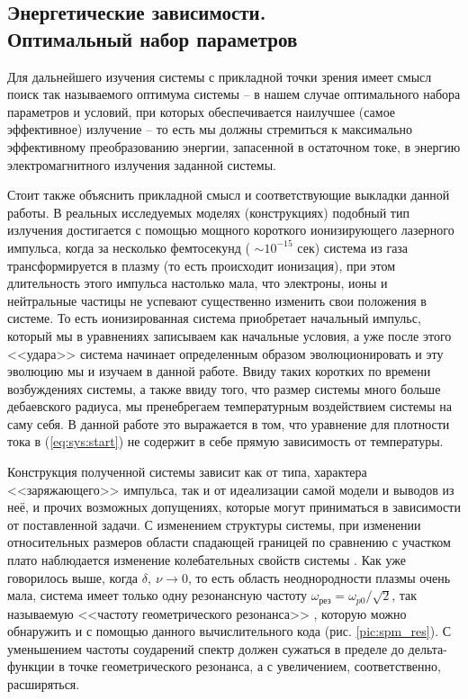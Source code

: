 \subsection{Энергетические зависимости. \\Оптимальный набор параметров}

Для дальнейшего изучения системы с прикладной точки зрения имеет смысл поиск так называемого оптимума системы -- в нашем случае оптимального набора параметров и условий, при которых обеспечивается наилучшее (самое эффективное) излучение -- то есть мы должны стремиться к максимально эффективному преобразованию энергии, запасенной в остаточном токе, в энергию электромагнитного излучения заданной системы. 

Стоит также объяснить прикладной смысл и соответствующие выкладки данной работы. В реальных исследуемых моделях (конструкциях) подобный тип излучения достигается с помощью мощного короткого ионизирующего лазерного импульса, когда за несколько фемтосекунд ( $\sim10^{-15}$ сек) система из газа трансформируется в плазму (то есть происходит ионизация), при этом длительность этого импульса настолько мала, что электроны, ионы и нейтральные частицы не успевают существенно изменить свои положения в системе. То есть ионизированная система приобретает начальный импульс, который мы в уравнениях записываем как начальные условия, а уже после этого <<удара>> система начинает определенным образом эволюционировать и эту эволюцию мы и изучаем в данной работе. Ввиду таких коротких по времени возбуждениях системы, а также ввиду того, что размер системы много больше дебаевского радиуса, мы пренебрегаем температурным воздействием системы на саму себя. В данной работе это выражается в том, что уравнение для плотности тока в (\ref{eq:sys:start}) не содержит в себе прямую зависимость от температуры.

Конструкция полученной системы зависит как от типа, характера <<заряжающего>> импульса, так и от идеализации самой модели и выводов из неё, и прочих возможных допущениях, которые могут приниматься в зависимости от поставленной задачи. С изменением структуры системы, при изменении относительных размеров области спадающей границей по сравнению с участком плато наблюдается изменение колебательных свойств системы \cite{Vved2005}. Как уже говорилось выше, когда $\delta,\:\nu\rightarrow0$, то есть область неоднородности плазмы очень мала, система  имеет только одну резонансную частоту $\omega_{\text{рез}}=\omega_{p 0}/\sqrt{2}$, так называемую <<частоту геометрического резонанса>> \cite{Gilden2000}, которую можно обнаружить и с помощью данного вычислительного кода (рис. \ref{pic:spm_res}). С уменьшением частоты соударений спектр должен сужаться в пределе до дельта-функции в точке геометрического резонанса, а с увеличением, соответственно, расширяться.

